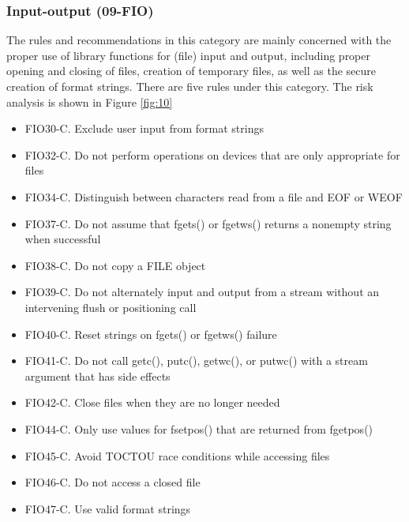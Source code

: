 \subsubsection{Input-output (09-FIO)} The rules and recommendations in this category are mainly concerned with the proper use of library functions for (file) input and output, including proper opening and closing of files, creation of temporary files, as well as the secure creation of format strings. There are five rules under this category. The risk analysis is shown in Figure \ref{fig:10}\cite{cert-c}
\begin{itemize}
\item FIO30-C. Exclude user input from format strings

\item FIO32-C. Do not perform operations on devices that are only appropriate for files

\item FIO34-C. Distinguish between characters read from a file and EOF or WEOF

\item FIO37-C. Do not assume that fgets() or fgetws() returns a nonempty string when successful

\item FIO38-C. Do not copy a FILE object

\item FIO39-C. Do not alternately input and output from a stream without an intervening flush or positioning call

\item FIO40-C. Reset strings on fgets() or fgetws() failure

\item FIO41-C. Do not call getc(), putc(), getwc(), or putwc() with a stream argument that has side effects

\item FIO42-C. Close files when they are no longer needed

\item FIO44-C. Only use values for fsetpos() that are returned from fgetpos()

\item FIO45-C. Avoid TOCTOU race conditions while accessing files

\item FIO46-C. Do not access a closed file

\item FIO47-C. Use valid format strings	
\end{itemize}
